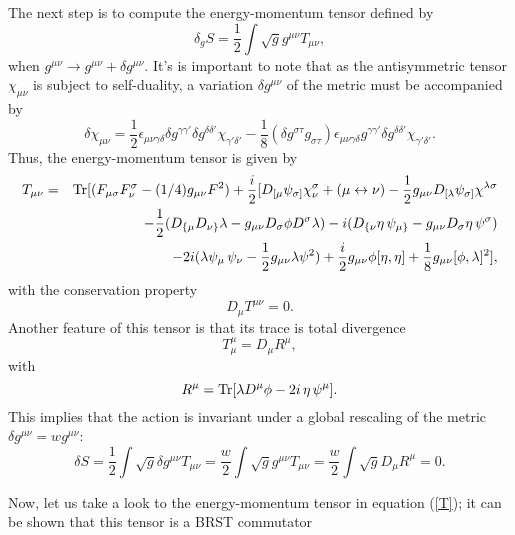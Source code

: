 \documentclass[12pt, onecolumn]{article}
\begin{document}
The next step is to compute the energy-momentum tensor defined by 
\begin{equation}
\delta_{g} S=\frac{1}{2}\int \sqrt{g}g^{\mu\nu}T_{\mu \nu},
\end{equation}
when $g^{\mu \nu}\rightarrow g^{\mu \nu}+\delta g^{\mu \nu}$. It's is important to note that as the antisymmetric tensor $\chi_{\mu\nu}$ is subject to self-duality, a variation $\delta g^{\mu \nu}$ of the metric must be accompanied by  
\begin{equation}
\delta \chi_{\mu \nu}= \frac{1}{2}\epsilon_{\mu \nu \gamma \delta}\delta g^{\gamma \gamma '} \delta g^{\delta \delta '}\chi_{\gamma '\delta '}-\frac{1}{8}(\delta g^{\sigma \tau}g_{\sigma \tau})\epsilon_{\mu \nu \gamma \delta}g^{\gamma \gamma '} \delta g^{\delta \delta '}\chi_{\gamma '\delta '}. 
\end{equation}
Thus, the energy-momentum tensor is given by
\begin{eqnarray}
T_{\mu \nu} &=& {\rm Tr} [(F_{\mu \sigma}F_\nu^\sigma-(1/4)g_{\mu \nu}F^2)+\frac{i}{2}[D_{[ \mu} \psi_{\sigma ]}\chi_\nu^\sigma + (\mu\leftrightarrow \nu) -\frac{1}{2} g_{\mu \nu}D_{[\lambda} \psi_{\sigma]}\chi^{\lambda\sigma} \nonumber\\&& -\frac{1}{2}(D_{\{\mu}D_{\nu\}}\lambda-g_{\mu \nu} D_\sigma \phi D^\sigma \lambda) -i (D_{\{\nu} \eta \,\psi_{\mu\}}-g_{\mu \nu} D_\sigma \eta \,\psi^\sigma) \nonumber \\&& -2i(\lambda \psi_\mu\,\psi_\nu -\frac{1}{2}g_{\mu \nu} \lambda \psi^2 )+\frac{i}{2}g_{\mu \nu} \phi [\eta,\eta]+\frac{1}{8}g_{\mu \nu}[\phi, \lambda]^2], \label{T}
\end{eqnarray}
with the conservation property $$ D_\mu T^{\mu \nu} = 0.$$
Another feature of this tensor is that its trace is total divergence
\begin{equation}
T^\mu_\mu=D_\mu R^\mu,
\end{equation} with 
\begin{equation}
R^\mu={\rm Tr}[\lambda D^\mu \phi - 2 i\,\eta\,\psi^\mu].
\end{equation}
This implies that the action is invariant under a global rescaling of the metric $\delta g^{\mu \nu}= w g^{\mu \nu}$:
\begin{equation}
\delta S=\frac{1}{2}\int \sqrt{g}\delta g^{\mu \nu} T_{\mu \nu} = \frac{w}{2}\int \sqrt{g}g^{\mu \nu} T_{\mu \nu}=\frac{w}{2}\int \sqrt{g} D_\mu R^\mu = 0.
\end{equation}


Now, let us take a look to the energy-momentum tensor in equation (\ref{T}); it can be shown that this tensor is a BRST commutator
\end{document}
